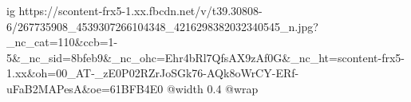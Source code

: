  
 
 
 
 

\ifcmt
  ig https://scontent-frx5-1.xx.fbcdn.net/v/t39.30808-6/267735908_4539307266104348_4216298382032340545_n.jpg?_nc_cat=110&ccb=1-5&_nc_sid=8bfeb9&_nc_ohc=Ehr4bRl7QfsAX9zAf0G&_nc_ht=scontent-frx5-1.xx&oh=00_AT-_zE0P02RZrJoSGk76-AQk8oWrCY-ERf-uFaB2MAPesA&oe=61BFB4E0
  @width 0.4
  @wrap 
\fi
